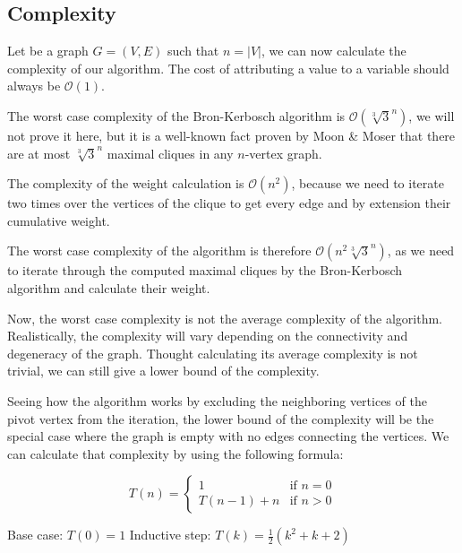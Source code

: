 \subsection{Complexity}

Let be a graph $G=(V,E)$ such that $n=|V|$, we can now calculate the complexity 
of our algorithm. The cost of attributing a value to a variable should
always be $\mathcal{O}(1)$. \newline

The worst case complexity of the Bron-Kerbosch algorithm is $\mathcal{O}(\sqrt[3]{3}^n)$,
we will not prove it here, but it is a well-known fact proven by Moon \& Moser
\cite{on-cliques-in-graphs} that there are at most $\sqrt[3]{3}^n$ maximal cliques
in any $n$-vertex graph. \newline

The complexity of the weight calculation is $\mathcal{O}(n^2)$, because we need
to iterate two times over the vertices of the clique to get every edge and by
extension their cumulative weight. \newline

The worst case complexity of the algorithm is therefore $\mathcal{O}(n^2\sqrt[3]{3}^n)$,
as we need to iterate through the computed maximal cliques by the Bron-Kerbosch
algorithm and calculate their weight. \newline

Now, the worst case complexity is not the average complexity of the algorithm.
Realistically, the complexity will vary depending on the connectivity and degeneracy 
of the graph. Thought calculating its average complexity is not trivial, we can 
still give a lower bound of the complexity. \newline

Seeing how the algorithm works by excluding the neighboring vertices of the pivot
vertex from the iteration, the lower bound of the complexity will be the special
case where the graph is empty with no edges connecting the vertices. We can
calculate that complexity by using the following formula:

\begin{equation}
    T(n)=\begin{cases}
        1        & \text{if } n=0 \\
        T(n-1)+n & \text{if } n>0
    \end{cases}
\end{equation}

Base case: $T(0)=1$ \newline
Inductive step: $T(k)=\frac{1}{2}(k^2+k+2)$

